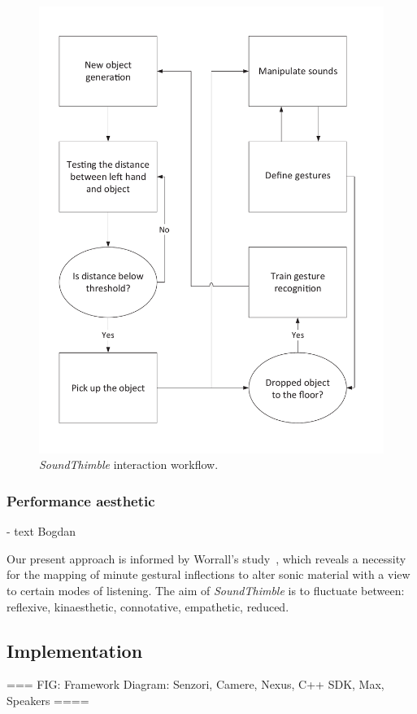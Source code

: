 \documentclass{nime-alternate}
\begin{document}
\begin{figure}[t]
	\centering
	\includegraphics[width=.8\columnwidth]{img/concept}
	\caption{\textit{SoundThimble} interaction workflow.}
	\label{fig:concept}
\end{figure}

\subsubsection{Performance aesthetic}

- text Bogdan

Our present approach is informed by Worrall's study~\cite{worrall2013understanding}, which reveals a necessity for the mapping of minute gestural inflections to alter sonic material with a view to certain modes of listening. The aim of \textit{SoundThimble} is to fluctuate between: reflexive, kinaesthetic, connotative, empathetic, reduced.

\subsection{Implementation}

=== FIG: Framework Diagram: Senzori, Camere, Nexus, C++ SDK, Max, Speakers ====


\end{document}
